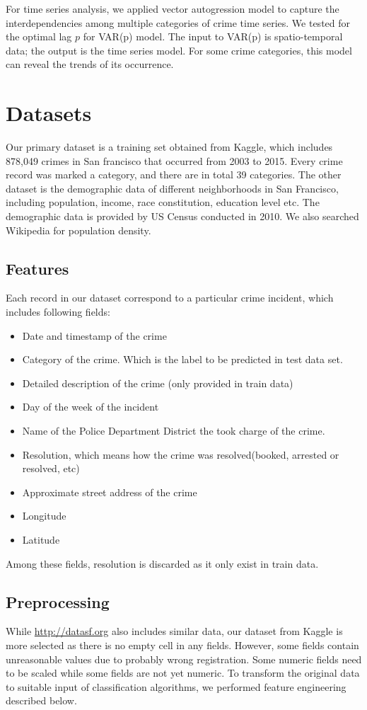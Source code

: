\documentclass[11pt,conference]{IEEEtran}
\begin{document}
For time series analysis, we  applied vector autogression model to capture the interdependencies among multiple categories of crime time series. We tested for the optimal lag $p$ for VAR(p) model. The input to VAR(p) is spatio-temporal data; the output is the time series model. For some crime categories, this model can reveal the trends of its occurrence.

\section{Datasets}
Our primary dataset is a training set obtained from Kaggle, which includes 878,049 crimes in San francisco that occurred from 2003 to 2015. Every crime record was marked a category, and there are in total 39 categories. The other dataset is the demographic data of different neighborhoods in San Francisco, including population, income, race constitution, education level etc. The demographic data is provided by US Census conducted in 2010. We also searched Wikipedia for population density. 
\subsection{Features}
Each record in our dataset correspond to a particular crime incident, which includes following fields:
\begin{itemize}
  \item Date and timestamp of the crime
  \item Category of the crime. Which is the label to be predicted in test data set.
  \item Detailed description of the crime (only provided in train data)
  \item Day of the week of the incident
  \item Name of the Police Department District the took charge of the crime.
  \item Resolution, which means how the crime was resolved(booked, arrested or resolved, etc)
  \item Approximate street address of the crime
  \item Longitude
  \item Latitude
\end{itemize}
Among these fields, resolution is discarded as it only exist in train data.
\subsection{Preprocessing}
While \url{http://datasf.org} also includes similar data, our dataset from Kaggle is more selected as there is no empty cell in any fields. However, some fields contain unreasonable values due to probably wrong registration. Some numeric fields need to be scaled while some fields are not yet numeric. To transform the original data to suitable input of classification algorithms, we performed feature engineering described below.
\end{document}
